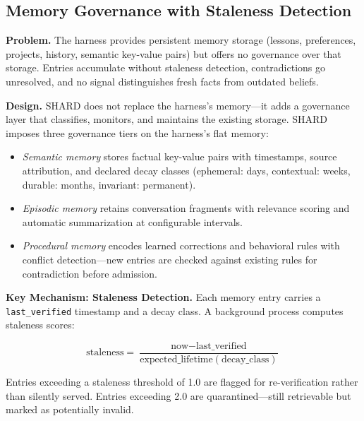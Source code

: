 \documentclass[11pt]{article}
\begin{document}
\subsection{Memory Governance with Staleness Detection}

\textbf{Problem.} The harness provides persistent memory storage (lessons, preferences, projects, history, semantic key-value pairs) but offers no governance over that storage. Entries accumulate without staleness detection, contradictions go unresolved, and no signal distinguishes fresh facts from outdated beliefs.

\textbf{Design.} SHARD does not replace the harness's memory---it adds a governance layer that classifies, monitors, and maintains the existing storage. SHARD imposes three governance tiers on the harness's flat memory:

\begin{itemize}[nosep]
\item \emph{Semantic memory} stores factual key-value pairs with timestamps, source attribution, and declared decay classes (ephemeral: days, contextual: weeks, durable: months, invariant: permanent).
\item \emph{Episodic memory} retains conversation fragments with relevance scoring and automatic summarization at configurable intervals.
\item \emph{Procedural memory} encodes learned corrections and behavioral rules with conflict detection---new entries are checked against existing rules for contradiction before admission.
\end{itemize}

\textbf{Key Mechanism: Staleness Detection.} Each memory entry carries a \texttt{last\_verified} timestamp and a decay class. A background process computes staleness scores:

\begin{equation}
\text{staleness} = \frac{\text{now} - \text{last\_verified}}{\text{expected\_lifetime}(\text{decay\_class})}
\end{equation}

Entries exceeding a staleness threshold of 1.0 are flagged for re-verification rather than silently served. Entries exceeding 2.0 are quarantined---still retrievable but marked as potentially invalid.
\end{document}
